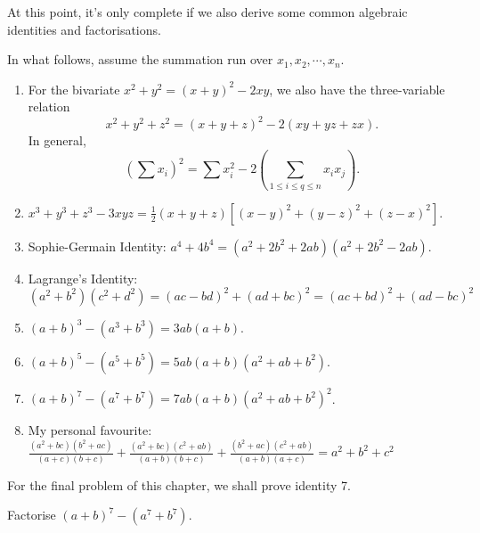 \documentclass[../main.tex]{subfiles}
\begin{document}
At this point, it's only complete if we also derive some common algebraic identities and factorisations. 
\begin{proposition}[Classic]
    In what follows, assume the summation run over $x_1,x_2,\cdots,x_n$.
    \begin{enumerate}
        \item For the bivariate $x^2+y^2=(x+y)^2-2xy$, we also have the three-variable relation $$x^2+y^2+z^2=(x+y+z)^2-2(xy+yz+zx).$$
        In general, $$\left(\sum x_i\right)^2=\sum x_i^2-2\left(\sum_{1\leq i\leq q\leq n}x_ix_j\right).$$

        \item $x^3+y^3+z^3-3xyz=\frac{1}{2}(x+y+z)[(x-y)^2+(y-z)^2+(z-x)^2]$.
        \item Sophie-Germain Identity: $a^4+4b^4=(a^2+2b^2+2ab)(a^2+2b^2-2ab)$.
        \item Lagrange's Identity: $(a^2+b^2)(c^2+d^2)=(ac-bd)^2+(ad+bc)^2=(ac+bd)^2+(ad-bc)^2$
        \item $(a+b)^3-(a^3+b^3)=3ab(a+b)$.
        \item $(a+b)^5-(a^5+b^5)=5ab(a+b)(a^2+ab+b^2)$.
        \item $(a+b)^7-(a^7+b^7)=7ab(a+b)(a^2+ab+b^2)^2$.
        \item My personal favourite: $\frac{(a^2+bc)(b^2+ac)}{(a+c)(b+c)}+\frac{(a^2+bc)(c^2+ab)}{(a+b)(b+c)}+\frac{(b^2+ac)(c^2+ab)}{(a+b)(a+c)}=a^2+b^2+c^2$
    \end{enumerate}
\end{proposition}
For the final problem of this chapter, we shall prove identity 7.
\begin{example}[Classic]
    Factorise $(a+b)^7-(a^7+b^7)$.
\end{example}
\end{document}

